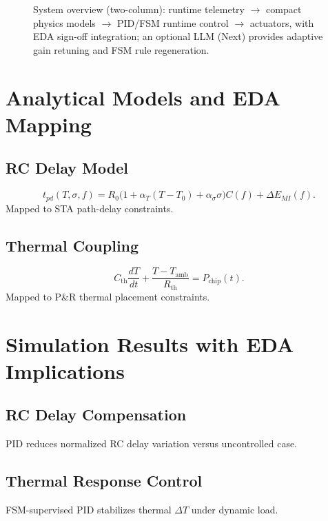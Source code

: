 \documentclass[conference]{IEEEtran}
\begin{document}
\begin{figure*}[t]

  \caption{System overview (two-column): runtime telemetry $\rightarrow$ compact physics models $\rightarrow$ PID/FSM runtime control $\rightarrow$ actuators, with EDA sign-off integration; an optional LLM (Next) provides adaptive gain retuning and FSM rule regeneration.}
  \label{fig:system_overview}
\end{figure*}

\section{Analytical Models and EDA Mapping}
\subsection{RC Delay Model}
\begin{equation}
t_{pd}(T,\sigma,f) = R_0 \big(1+\alpha_T (T-T_0) + \alpha_\sigma \sigma \big) C(f) + \Delta E_{MI}(f).
\end{equation}
Mapped to STA path-delay constraints.

\subsection{Thermal Coupling}
\begin{equation}
C_{\text{th}} \frac{dT}{dt} + \frac{T - T_{\text{amb}}}{R_{\text{th}}} = P_{\text{chip}}(t).
\end{equation}
Mapped to P\&R thermal placement constraints.

\section{Simulation Results with EDA Implications}
\subsection{RC Delay Compensation}
PID reduces normalized RC delay variation versus uncontrolled case.

\subsection{Thermal Response Control}
FSM-supervised PID stabilizes thermal $\Delta T$ under dynamic load.
\end{document}
